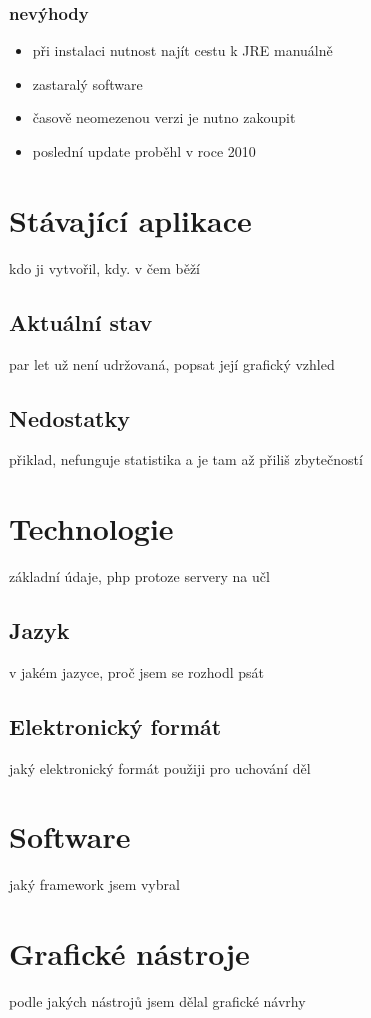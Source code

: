             \subsubsection{nevýhody}
                \begin{itemize}
                    \item při instalaci nutnost najít cestu k JRE manuálně
                    \item zastaralý software
                    \item časově neomezenou verzi je nutno zakoupit
                    \item poslední update proběhl v roce 2010
                \end{itemize}
                
    \section{Stávající aplikace}
        kdo ji vytvořil, kdy. v čem běží
        
        \subsection{Aktuální stav}
            par let už není udržovaná, popsat její grafický vzhled
            
        \subsection{Nedostatky}
            přiklad, nefunguje statistika a je tam až přiliš zbytečností
            
    \section{Technologie}
        základní údaje, php protoze servery na učl
        \subsection{Jazyk}
            v jakém jazyce, proč jsem se rozhodl psát
        \subsection{Elektronický formát}
            jaký elektronický formát použiji pro uchování děl
    \section{Software}
        jaký framework jsem vybral
    \section{Grafické nástroje}
        podle jakých nástrojů jsem dělal grafické návrhy
